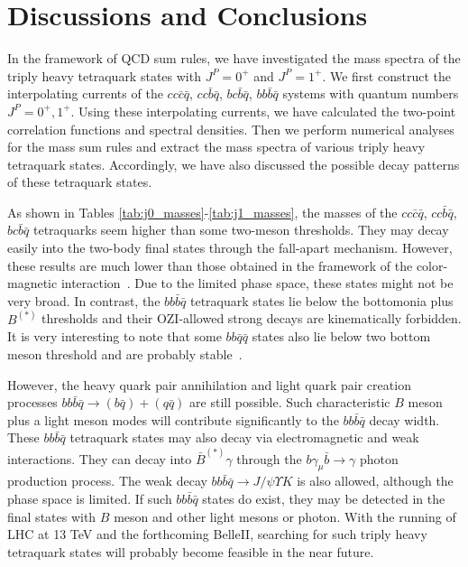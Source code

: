 \documentclass[prd,showpacs,showkeys,floatfix,amsmath,amssymb,floatfix,english]{revtex4}
\begin{document}
\section{Discussions and Conclusions}
\label{sec5}

In the framework of QCD sum rules, we have investigated the mass
spectra of the triply heavy tetraquark states with $J^{P}=0^{+}$ and
$J^{P}=1^{+}$. We first construct the interpolating currents of the
$cc\bar{c}\bar{q}$, $cc\bar{b}\bar{q}$, $bc\bar{b}\bar{q}$,
$bb\bar{b}\bar{q}$ systems with quantum numbers $J^{P}=0^{+},
1^{+}$. Using these interpolating currents, we have calculated the
two-point correlation functions and spectral densities. Then we
perform numerical analyses for the mass sum rules and extract the
mass spectra of various triply heavy tetraquark states. Accordingly,
we have also discussed the possible decay patterns of these
tetraquark states.

As shown in Tables \ref{tab:j0_masses}-\ref{tab:j1_masses}, the
masses of the $cc\bar{c}\bar{q}$, $cc\bar{b}\bar{q}$,
$bc\bar{b}\bar{q}$ tetraquarks seem higher than some two-meson
thresholds. They may decay easily into the two-body final states
through the fall-apart mechanism. However, these results are much
lower than those obtained in the framework of the color-magnetic
interaction~\cite{2017-Chen-p5-5}. Due to the limited phase space,
these states  might not be very broad. In contrast, the
$bb\bar{b}\bar{q}$ tetraquark states lie below the bottomonia plus
$B^{(*)}$ thresholds and their OZI-allowed strong decays are
kinematically forbidden. It is very interesting to note that some
$bb\bar{q}\bar{q}$ states also lie below two bottom meson threshold
and are probably stable~\cite{2013-Du-p14003-14003,2014-Chen-p54037-54037,
2017-Karliner-p-,2007-Cui-p7-13,2017-Luo-p-}.

However, the heavy quark pair annihilation and light quark pair
creation processes $bb\bar b\bar q\to (b\bar q) + (q\bar q)$ are
still possible. Such characteristic $B$ meson plus a light meson
modes will contribute significantly to the $bb\bar{b}\bar{q}$ decay
width. These $bb\bar{b}\bar{q}$ tetraquark states may also decay via
electromagnetic and weak interactions. They can decay into $\bar
B^{(\ast)}\gamma$ through the $b\gamma_\mu\bar b\to\gamma$ photon
production process. The weak decay $bb\bar b\bar q\to J/\psi\Upsilon
K$ is also allowed, although the phase space is limited. If such
$bb\bar{b}\bar{q}$ states do exist, they may be detected in the
final states with $B$ meson and other light mesons or photon. With
the running of LHC at 13 TeV and the forthcoming BelleII, searching
for such triply heavy tetraquark states will probably become
feasible in the near future.
\end{document}
